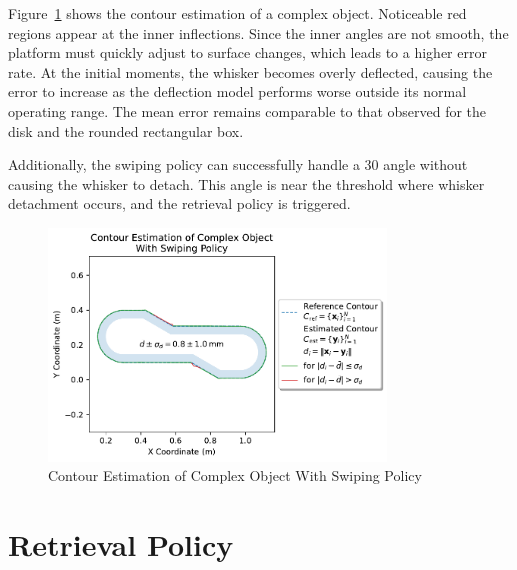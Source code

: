 Figure~\ref{fig:experiment-complex-object-swiping} shows the contour estimation of a complex object.
Noticeable red regions appear at the inner inflections.
Since the inner angles are not smooth, the platform must quickly adjust to surface changes, which leads to a higher error rate.
At the initial moments, the whisker becomes overly deflected, causing the error to increase as the deflection model performs worse outside its normal operating range.
The mean error remains comparable to that observed for the disk and the rounded rectangular box.

Additionally, the swiping policy can successfully handle a 30\degree{} angle without causing the whisker to detach.
This angle is near the threshold where whisker detachment occurs, and the retrieval policy is triggered.

\begin{figure}[!htb]
    \centering
    \includegraphics[width=0.8\textwidth]{figures/experiments/complex-object-swiping}
    \caption{Contour Estimation of Complex Object With Swiping Policy}
    \label{fig:experiment-complex-object-swiping}
\end{figure}


\section{Retrieval Policy}

